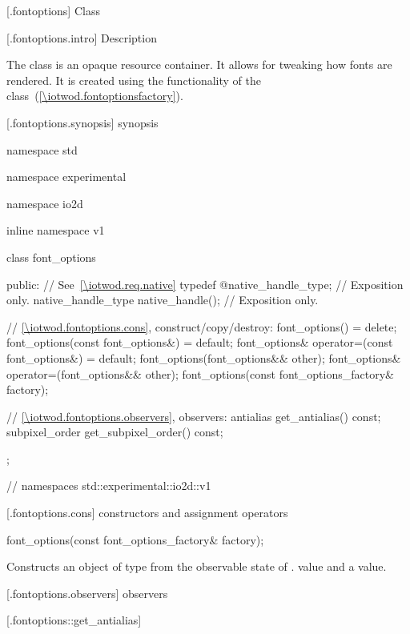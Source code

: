  [\iotwod.fontoptions] {Class }

 [\iotwod.fontoptions.intro] { Description}

\pnum
{}%
The  class is an opaque resource container. It allows for 
tweaking how fonts are rendered. It is created using the functionality of the 
 class~(\ref{\iotwod.fontoptionsfactory}).

 [\iotwod.fontoptions.synopsis] { synopsis}

\begin{codeblock}
namespace std { namespace experimental { namespace io2d { inline namespace v1 {
  class font_options {
    public:
    // See~\ref{\iotwod.req.native}
    typedef @\impdef@ native_handle_type; // Exposition only.
    native_handle_type native_handle(); // Exposition only.
  	
    // \ref{\iotwod.fontoptions.cons}, construct/copy/destroy:
    font_options() = delete;
    font_options(const font_options&) = default;
    font_options& operator=(const font_options&) = default;
    font_options(font_options&& other);
    font_options& operator=(font_options&& other);
    font_options(const font_options_factory& factory);

    // \ref{\iotwod.fontoptions.observers}, observers:
    antialias get_antialias() const;
    subpixel_order get_subpixel_order() const;
  };
} } } } // namespaces std::experimental::io2d::v1
\end{codeblock}

 [\iotwod.fontoptions.cons] { constructors and 
assignment 
operators}

%
\begin{itemdecl}
	font_options(const font_options_factory& factory);
\end{itemdecl}

\begin{itemdescr}
	\pnum
	\effects
	Constructs an object of type  from the observable state 
	of . 
	value and a  value.
\end{itemdescr}

 [\iotwod.fontoptions.observers] { observers}

 [\iotwod.fontoptions::get_antialias] 
{}

